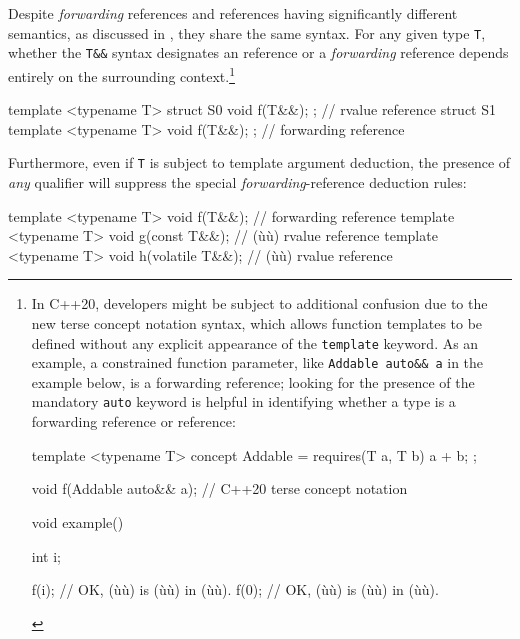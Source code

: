 Despite \emph{forwarding} references and  
references having significantly different semantics, as discussed in , 
they share the same syntax. For any given type \lstinline!T!,
whether the \lstinline!T&&! syntax designates an  
reference or a \emph{forwarding} reference depends entirely on the
surrounding context.{\cprotect\footnote{In C++20, developers might be
subject to additional confusion due to the new terse concept notation
syntax, which allows function templates to be defined without any
explicit appearance of the \lstinline!template! keyword. As an example, a
constrained function parameter, like
\lstinline!Addable!~\lstinline!auto&&!~\lstinline!a! in the example below, is a forwarding
reference; looking for the presence of the mandatory \lstinline!auto!
keyword is helpful in identifying whether a type is a forwarding
reference or  reference:

\begin{emcppslisting}[emcppsstandards=c++20,style=footcode]
template <typename T>
concept Addable = requires(T a, T b) { a + b; };

void f(Addable auto&& a);  // C++20 terse concept notation

void example()
{
    int i;

    f(i);  // OK, (ù{}ù) is (ù{}ù) in (ù{}ù).
    f(0);  // OK, (ù{}ù) is (ù{}ù) in (ù{}ù).
}
\end{emcppslisting}
      }}

\begin{emcppslisting}
template <typename T> struct S0 { void f(T&&); };  // rvalue reference
struct S1 { template <typename T> void f(T&&); };  // forwarding reference
\end{emcppslisting}

\noindent Furthermore, even if \lstinline!T! is subject to template argument
deduction, the presence of \emph{any} qualifier will suppress the
special \emph{forwarding}-reference deduction rules:

\begin{emcppslisting}
template <typename T> void f(T&&);           // forwarding reference
template <typename T> void g(const T&&);     // (ù{}ù) rvalue reference
template <typename T> void h(volatile T&&);  // (ù{}ù) rvalue reference
\end{emcppslisting}

